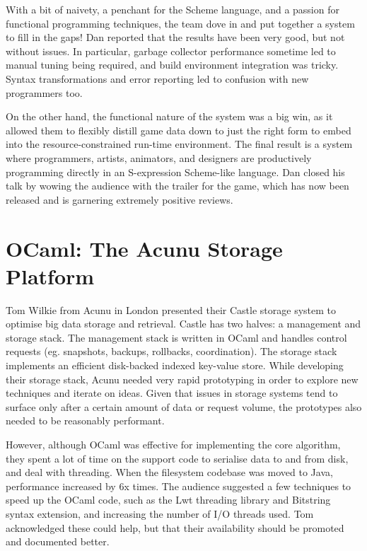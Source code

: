 \documentclass{jfp1}
\begin{document}
With a bit of naivety, a penchant for the Scheme language, and a passion for
functional programming techniques, the team dove in and put together a system
to fill in the gaps!  Dan reported that the results have been very good, but
not without issues.  In particular, garbage collector performance sometime led
to manual tuning being required, and build environment integration was tricky.
Syntax transformations and error reporting led to confusion with new
programmers too.

On the other hand, the functional nature of the system was a big win, as it
allowed them to flexibly distill game data down to just the right form to embed
into the resource-constrained run-time environment.  The final result is a
system where programmers, artists, animators, and designers are productively
programming directly in an S-expression Scheme-like language.  Dan closed his
talk by wowing the audience with the trailer for the game, which has now been
released and is garnering extremely positive reviews.

\section{OCaml: The Acunu Storage Platform}

Tom Wilkie from Acunu in London presented their Castle storage system to
optimise big data storage and retrieval. Castle has two halves: a management
and storage stack.  The management stack  is written in OCaml and handles
control requests (eg. snapshots, backups, rollbacks, coordination). The storage
stack implements an efficient disk-backed indexed key-value store. While
developing their storage stack, Acunu needed very rapid prototyping in order to
explore new techniques and iterate on ideas. Given that issues in storage
systems tend to surface only after a certain amount of data or request volume,
the prototypes also needed to be reasonably performant.

However, although OCaml was effective for implementing the core algorithm, they
spent a lot of time on the support code to serialise data to and from disk, and
deal with threading. When the filesystem codebase was moved to Java,
performance increased by 6x times. The audience suggested a few techniques to
speed up the OCaml code, such as the Lwt threading library and Bitstring syntax
extension, and increasing the number of I/O threads used. Tom acknowledged
these could help, but that their availability should be promoted and documented
better.
\end{document}
